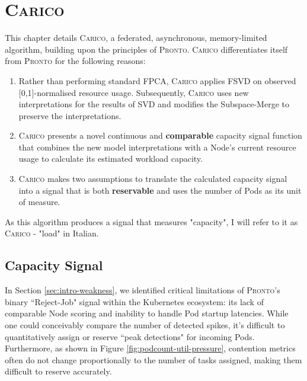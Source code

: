 \chapter{\protect\textsc{Carico}}
This chapter details \textsc{Carico}, a federated, asynchronous,
memory-limited algorithm, building upon the principles of \textsc{Pronto}.
\textsc{Carico} differentiates itself from \textsc{Pronto} for the following
reasons:
\begin{enumerate}
    \item Rather than performing standard FPCA, \textsc{Carico} applies FSVD on
        observed [0,1]-normalised resource usage. Subsequently, \textsc{Carico} uses
        new interpretations for the results of SVD and modifies the
        Subspace-Merge to preserve the interpretations.
    \item \textsc{Carico} presents a novel continuous and \textbf{comparable}
        capacity signal function that combines the new model interpretations
        with a Node's current resource usage to calculate its estimated
        workload capacity.
    \item \textsc{Carico} makes two assumptions to translate the calculated
        capacity signal into a signal that is both \textbf{reservable} and uses
        the number of Pods as its unit of measure.
\end{enumerate}
As this algorithm produces a signal that measures "capacity", I will refer to it
as \textsc{Carico} - "load" in Italian.

\section{Capacity Signal}
In Section \ref{sec:intro-weakness}, we identified critical limitations of
\textsc{Pronto}'s binary ``Reject-Job" signal within the Kubernetes ecosystem:
its lack of comparable Node scoring and inability to handle Pod startup
latencies. While one could conceivably compare the number of detected spikes,
it's difficult to quantitatively assign or reserve ``peak detections" for
incoming Pods. Furthermore, as shown in Figure
\ref{fig:podcount-util-pressure}, contention metrics often do not change
proportionally to the number of tasks assigned, making them difficult to
reserve accurately.

